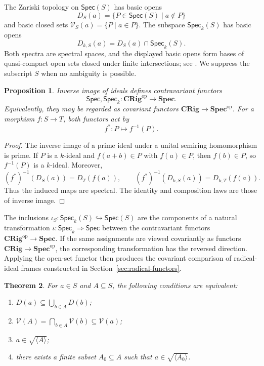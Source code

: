 \documentclass[12pt,leqno]{amsart}
\newcommand{\CRig}{\mathbf{CRig}}
\newcommand{\SpecSp}{\mathbf{Spec}}
\newcommand{\Spec}{\mathsf{Spec}}
\newcommand{\Speck}{\mathsf{Spec}_{k}}
\newcommand{\op}{\mathrm{op}}
\newtheorem{theorem}{Theorem}[section]
\newtheorem{proposition}[theorem]{Proposition}
\theoremstyle{definition}
\numberwithin{equation}{section}
\theoremstyle{remark}
\begin{document}
The Zariski topology on \(\Spec(S)\) has basic opens
\[
D_S(a)=\{P\in\Spec(S)\mid a\notin P\}
\]
and basic closed sets \(\mathcal V_S(a)=\{P\mid a\in P\}\). The subspace \(\Speck(S)\) has basic opens
\[
D_{k,S}(a)=D_S(a)\cap\Speck(S).
\]
Both spectra are spectral spaces, and the displayed basic opens form bases of quasi-compact open sets closed under finite intersections; see \cite[Proposition~3.6]{Ray22}. We suppress the subscript $S$ when no ambiguity is possible.

\begin{proposition}\label{prop:spectrum-functors}
Inverse image of ideals defines contravariant functors
\[
\Spec,\Speck\colon\CRig^{\op}\longrightarrow\SpecSp.
\]
Equivalently, they may be regarded as covariant functors \(\CRig\to\SpecSp^{\op}\). For a morphism \(f\colon S\to T\), both functors act by
\[
f^*\colon P\longmapsto f^{-1}(P).
\]
\end{proposition}

\begin{proof}
The inverse image of a prime ideal under a unital semiring homomorphism is prime. If $P$ is a $k$-ideal and \(f(a+b)\in P\) with \(f(a)\in P\), then \(f(b)\in P\), so \(f^{-1}(P)\) is a $k$-ideal. Moreover,
\[
(f^*)^{-1}(D_S(a))=D_T(f(a)),
\qquad
(f^*)^{-1}(D_{k,S}(a))=D_{k,T}(f(a)).
\]
Thus the induced maps are spectral. The identity and composition laws are those of inverse image.
\end{proof}

The inclusions \(\iota_S\colon\Speck(S)\hookrightarrow\Spec(S)\) are the components of a natural transformation \(\iota\colon\Speck\Longrightarrow\Spec\) between the contravariant functors \(\CRig^{\op}\to\SpecSp\). If the same assignments are viewed covariantly as functors \(\CRig\to\SpecSp^{\op}\), the corresponding transformation has the reversed direction. Applying the open-set functor then produces the covariant comparison of radical-ideal frames constructed in Section~\ref{sec:radical-functors}.

\begin{theorem}\label{thm:basic-open-cover}
For \(a\in S\) and \(A\subseteq S\), the following conditions are equivalent:
\begin{enumerate}
\item \(D(a)\subseteq\bigcup_{b\in A}D(b)\);
\item \(\mathcal V(A)=\bigcap_{b\in A}\mathcal V(b)\subseteq\mathcal V(a)\);
\item \(a\in\sqrt{\langle A\rangle}\);
\item there exists a finite subset \(A_0\subseteq A\) such that \(a\in\sqrt{\langle A_0\rangle}\).
\end{enumerate}
\end{theorem}
\end{document}
